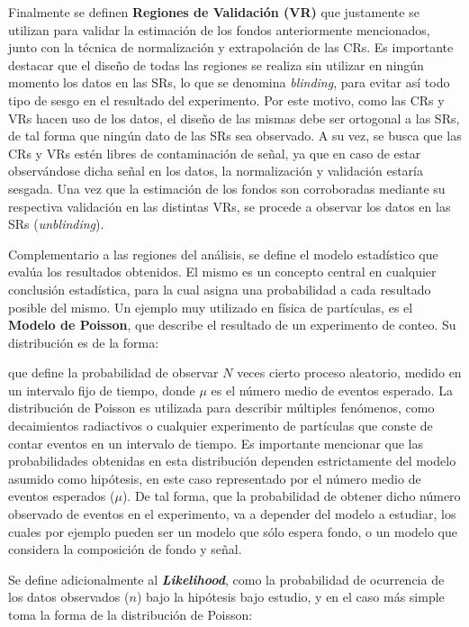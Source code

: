 Finalmente se definen \textbf{Regiones de Validación (VR)} que justamente se utilizan para validar la estimación de los fondos anteriormente mencionados, junto con la técnica de normalización y extrapolación de las CRs. Es importante destacar que el diseño de todas las regiones se realiza sin utilizar en ningún momento los datos en las SRs, lo que se denomina \textit{blinding}, para evitar así todo tipo de sesgo en el resultado del experimento. Por este motivo, como las CRs y VRs hacen uso de los datos, el diseño de las mismas debe ser ortogonal a las SRs, de tal forma que ningún dato de las SRs sea observado. A su vez, se busca que las CRs y VRs estén libres de contaminación de señal, ya que en caso de estar observándose dicha señal en los datos, la normalización y validación estaría sesgada.
Una vez que la estimación de los fondos son corroboradas mediante su respectiva validación en las distintas VRs, se procede a observar los datos en las SRs (\textit{unblinding}).

Complementario a las regiones del análisis, se define el modelo estadístico que evalúa los resultados obtenidos. El mismo es un concepto central en cualquier conclusión estadística, para la cual asigna una probabilidad a cada resultado posible del mismo. Un ejemplo muy utilizado en física de partículas, es el \textbf{Modelo de Poisson}, que describe el resultado de un experimento de conteo. Su distribución es de la forma:


que define la probabilidad de observar $N$ veces cierto proceso aleatorio, medido en un intervalo fijo de tiempo, donde $\mu$ es el número medio de eventos esperado. La distribución de Poisson es utilizada para describir múltiples fenómenos, como decaimientos radiactivos o cualquier experimento de partículas que conste de contar eventos en un intervalo de tiempo. Es importante mencionar que las probabilidades obtenidas en esta distribución dependen estrictamente del modelo asumido como hipótesis, en este caso representado por el número medio de eventos esperados ($\mu$). De tal forma, que la probabilidad de obtener dicho número observado de eventos en el experimento, va a depender del modelo a estudiar, los cuales por ejemplo pueden ser un modelo que sólo espera fondo, o un modelo que considera la composición de fondo y señal. 

Se define adicionalmente al \textbf{\textit{Likelihood}}, como la probabilidad de ocurrencia de los datos observados ($n$) bajo la hipótesis bajo estudio, y en el caso más simple toma la forma de la distribución de Poisson:



